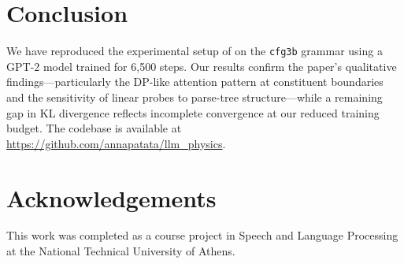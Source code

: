 \documentclass[10pt,twocolumn]{article}
\begin{document}
\section{Conclusion}
\label{sec:conclusion}

We have reproduced the experimental setup of \citet{allen-zhu2023physics} on the \texttt{cfg3b} grammar using a GPT-2 model trained for 6{,}500 steps. Our results confirm the paper's qualitative findings—particularly the DP-like attention pattern at constituent boundaries and the sensitivity of linear probes to parse-tree structure—while a remaining gap in KL divergence reflects incomplete convergence at our reduced training budget. The codebase is available at \url{https://github.com/annapatata/llm_physics}.

\section*{Acknowledgements}

This work was completed as a course project in Speech and Language Processing at the National Technical University of Athens.



\end{document}
